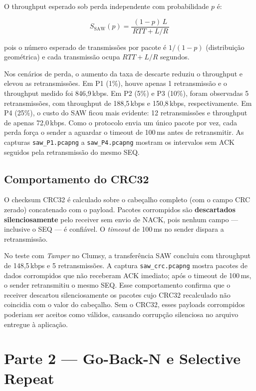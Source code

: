 \documentclass[10pt,a4paper]{article}
\begin{document}
\noindent O throughput esperado sob perda independente com probabilidade $p$ é:

\begin{equation}
  S_{\text{SAW}}(p) = \frac{(1-p)\,L}{\,RTT + L/R\,}
  \label{eq:saw_loss}
\end{equation}

pois o número esperado de transmissões por pacote é $1/(1-p)$ (distribuição geométrica)
e cada transmissão ocupa $RTT + L/R$ segundos.

Nos cenários de perda, o aumento da taxa de descarte reduziu o throughput e
elevou as retransmissões. Em P1 (1\%), houve apenas 1 retransmissão e o
throughput medido foi 846{,}9\,kbps. Em P2 (5\%) e P3 (10\%), foram observadas
5 retransmissões, com throughput de 188{,}5\,kbps e 150{,}8\,kbps,
respectivamente. Em P4 (25\%), o custo do SAW ficou mais evidente: 12
retransmissões e throughput de apenas 72{,}0\,kbps. Como o protocolo envia um
único pacote por vez, cada perda força o sender a aguardar o timeout de 100\,ms
antes de retransmitir. As capturas \texttt{saw\_P1.pcapng} a
\texttt{saw\_P4.pcapng} mostram os intervalos sem ACK seguidos pela retransmissão
do mesmo SEQ.

\subsection{Comportamento do CRC32}

O checksum CRC32 é calculado sobre o cabeçalho completo (com o campo CRC zerado)
concatenado com o payload. Pacotes corrompidos são \textbf{descartados silenciosamente}
pelo receiver sem envio de NACK, pois nenhum campo — inclusive o SEQ — é confiável.
O \textit{timeout} de 100\,ms no sender dispara a retransmissão.

No teste com \textit{Tamper} no Clumsy, a transferência SAW concluiu com
throughput de 148{,}5\,kbps e 5 retransmissões. A captura
\texttt{saw\_crc.pcapng} mostra pacotes de dados corrompidos que não receberam
ACK imediato; após o timeout de 100\,ms, o sender retransmitiu o mesmo SEQ. Esse
comportamento confirma que o receiver descartou silenciosamente os pacotes cujo
CRC32 recalculado não coincidia com o valor do cabeçalho. Sem o CRC32, esses
payloads corrompidos poderiam ser aceitos como válidos, causando corrupção
silenciosa no arquivo entregue à aplicação.

\section{Parte 2 — Go-Back-N e Selective Repeat}
\end{document}
